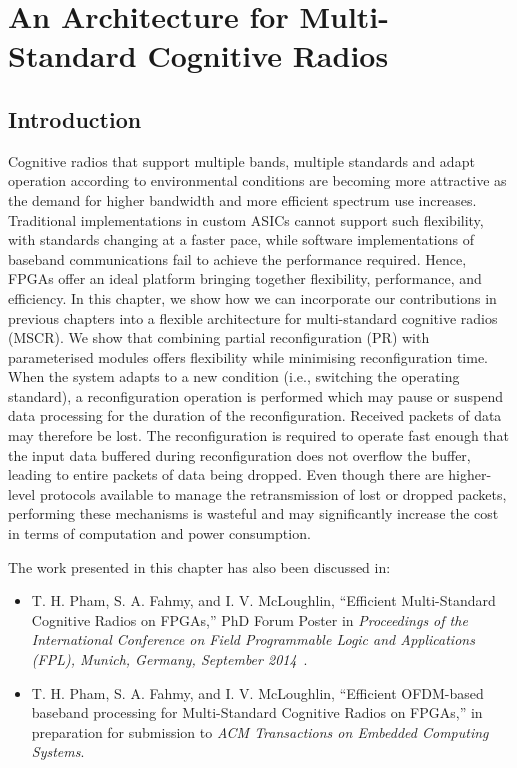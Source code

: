 \chapter{An Architecture for Multi-Standard Cognitive Radios}
\label{chap:MSCR}
\section{Introduction}
Cognitive radios that support multiple bands, multiple standards and adapt operation according to environmental conditions are becoming more attractive as the demand for higher bandwidth and more efficient spectrum use increases.
Traditional implementations in custom ASICs cannot support such flexibility, with standards changing at a faster pace, while software implementations of baseband communications fail to achieve the performance required.
Hence, FPGAs offer an ideal platform bringing together flexibility, performance, and efficiency.
In this chapter, we show how we can incorporate our contributions in previous chapters into a flexible architecture for multi-standard cognitive radios (MSCR).
We show that combining partial reconfiguration (PR) with parameterised  modules offers flexibility while minimising reconfiguration time.
When the system adapts to a new condition (i.e., switching the operating standard), a reconfiguration operation is performed which may pause or suspend data processing for the duration of the reconfiguration. Received packets of data may therefore be lost.
The reconfiguration is required to operate fast enough that the input data buffered during reconfiguration does not overflow the buffer, leading to entire packets of data being dropped. Even though there are higher-level protocols available to manage the retransmission of lost or dropped packets, performing these mechanisms is wasteful and may significantly increase the cost in terms of computation and power consumption.

The work presented in this chapter has also been discussed in:
\begin{itemize}
\item T. H. Pham, S. A. Fahmy, and I. V. McLoughlin, ``Efficient Multi-Standard Cognitive Radios on FPGAs,'' PhD Forum Poster in \textit{Proceedings of the International Conference on Field Programmable Logic and Applications (FPL), Munich, Germany, September 2014}~\cite{Pham2014a}.
\item T. H. Pham, S. A. Fahmy, and I. V. McLoughlin, ``Efficient OFDM-based baseband processing for Multi-Standard Cognitive Radios on FPGAs,'' in preparation for submission to \emph{ACM Transactions on Embedded Computing Systems}.
\end{itemize}

